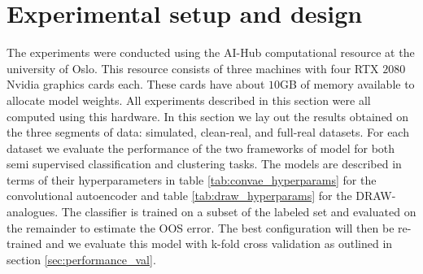 \section{Experimental setup and design}

The experiments were conducted using the AI-Hub computational resource at the university of Oslo.  This resource consists of three machines with four RTX $2080$ Nvidia graphics cards each. These cards have about $10$GB of memory available to allocate model weights. All experiments described in this section were all computed using this hardware. In this section we lay out the results obtained on the three segments of data: simulated, clean-real, and full-real datasets. For each dataset we evaluate the performance of the two frameworks of model for both semi supervised classification and clustering tasks. The models are described in terms of their hyperparameters in table \ref{tab:convae_hyperparams} for the convolutional autoencoder and table \ref{tab:draw_hyperparams} for the DRAW-analogues. The classifier is trained on a subset of the labeled set and evaluated on the remainder to estimate the OOS error. The best configuration will then be re-trained and we evaluate this model with k-fold cross validation as outlined in section \ref{sec:performance_val}.


